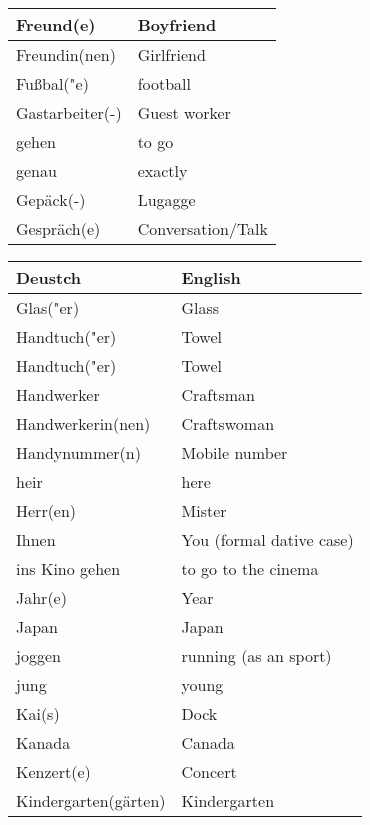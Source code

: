 \documentclass{article}
\renewcommand{\arraystretch}{1}
\begin{document}
\begin{minipage}{0.48\textwidth}
\begin{tabular}{|>{\raggedright\arraybackslash}p{3.5cm}|>{\raggedright\arraybackslash}p{3.5cm}|}
        Freund(e) & Boyfriend \\\hline
        Freundin(nen) & Girlfriend \\\hline
        Fu\ss{}bal("e) & football \\\hline
        Gastarbeiter(-) & Guest worker \\\hline
        gehen & to go \\\hline
        genau & exactly \\\hline
        Gepäck(-) & Lugagge \\\hline
        Gespräch(e) & Conversation/Talk \\\hline
    \end{tabular}
\end{minipage}%
\hfill
\begin{minipage}{0.48\textwidth}
    \centering
    \renewcommand{\arraystretch}{1.5}
    \begin{tabular}{|>{\raggedright\arraybackslash}p{3.5cm}|>{\raggedright\arraybackslash}p{3.5cm}|}
        \hline
        \rowcolor{gray!20} \textbf{Deustch} & \textbf{English} \\
        \hline
        Glas("er) & Glass \\\hline
        Handtuch("er) & Towel \\\hline
        Handtuch("er) & Towel \\\hline
        Handwerker & Craftsman \\\hline
        Handwerkerin(nen) & Craftswoman \\\hline
        Handynummer(n) & Mobile number \\\hline
        heir & here \\\hline
        Herr(en) & Mister \\\hline
        Ihnen & You (formal dative case) \\\hline
        ins Kino gehen & to go to the cinema \\\hline
        Jahr(e) & Year \\\hline
        Japan & Japan \\\hline
        joggen & running (as an sport) \\\hline
        jung & young \\\hline
        Kai(s) & Dock \\\hline
        Kanada & Canada \\\hline
        Kenzert(e) & Concert \\\hline
        Kindergarten(gärten) & Kindergarten \\\hline

\end{tabular}
\end{minipage}
\end{document}
